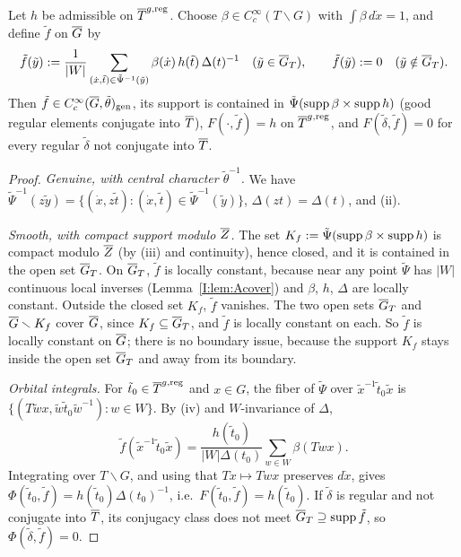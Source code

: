 \begin{lemma}\label{I:lem:Arealize}
Let $h$ be admissible on $\overline{T}^{g,\mathrm{reg}}$. Choose $\beta\in C_c^\infty(T\backslash G)$ with $\int\beta\,d\dot x=1$, and define $\tilde f$ on $\overline{G}$ by
\[ \tilde f(\tilde y):=\frac1{|W|}\sum_{(\dot x,\tilde t)\in\tilde\Psi^{-1}(\tilde y)}\beta(\dot x)\,h(\tilde t)\,\Delta(t)^{-1}\quad(\tilde y\in\overline{G}_T),\qquad\tilde f(\tilde y):=0\quad(\tilde y\notin\overline{G}_T). \]
Then $\tilde f\in C_c^\infty(\overline{G},\tilde\theta)_{\mathrm{gen}}$, its support is contained in $\tilde\Psi(\operatorname{supp}\beta\times\operatorname{supp} h)$ (good regular elements conjugate into $\overline{T}$), $F(\cdot,\tilde f)=h$ on $\overline{T}^{g,\mathrm{reg}}$, and $F(\tilde\delta,\tilde f)=0$ for every regular $\tilde\delta$ not conjugate into $\overline{T}$.
\end{lemma}
\begin{proof}
\emph{Genuine, with central character $\tilde\theta^{-1}$.} We have $\tilde\Psi^{-1}(z\tilde y)=\{(\dot x,z\tilde t):(\dot x,\tilde t)\in\tilde\Psi^{-1}(\tilde y)\}$, $\Delta(zt)=\Delta(t)$, and (ii).

\emph{Smooth, with compact support modulo $\overline{Z}$.} The set $K_f:=\tilde\Psi(\operatorname{supp}\beta\times\operatorname{supp} h)$ is compact modulo $\overline{Z}$ (by (iii) and continuity), hence closed, and it is contained in the open set $\overline{G}_T$. On $\overline{G}_T$, $\tilde f$ is locally constant, because near any point $\tilde\Psi$ has $|W|$ continuous local inverses (Lemma~\ref{I:lem:Acover}) and $\beta$, $h$, $\Delta$ are locally constant. Outside the closed set $K_f$, $\tilde f$ vanishes. The two open sets $\overline{G}_T$ and $\overline{G}\smallsetminus K_f$ cover $\overline{G}$, since $K_f\subseteq\overline{G}_T$, and $\tilde f$ is locally constant on each. So $\tilde f$ is locally constant on $\overline{G}$; there is no boundary issue, because the support $K_f$ stays inside the open set $\overline{G}_T$ and away from its boundary.

\emph{Orbital integrals.} For $\tilde t_0\in\overline{T}^{g,\mathrm{reg}}$ and $x\in G$, the fiber of $\tilde\Psi$ over $\tilde x^{-1}\tilde t_0\tilde x$ is $\{(T\tilde wx,\tilde w\tilde t_0\tilde w^{-1}):w\in W\}$. By (iv) and $W$-invariance of $\Delta$,
\[ \tilde f(\tilde x^{-1}\tilde t_0\tilde x)=\frac{h(\tilde t_0)}{|W|\Delta(t_0)}\sum_{w\in W}\beta(Twx). \]
Integrating over $T\backslash G$, and using that $Tx\mapsto Twx$ preserves $d\dot x$, gives $\Phi(\tilde t_0,\tilde f)=h(\tilde t_0)\Delta(t_0)^{-1}$, i.e.\ $F(\tilde t_0,\tilde f)=h(\tilde t_0)$. If $\tilde\delta$ is regular and not conjugate into $\overline{T}$, its conjugacy class does not meet $\overline{G}_T\supseteq\operatorname{supp}\tilde f$, so $\Phi(\tilde\delta,\tilde f)=0$.
\end{proof}

